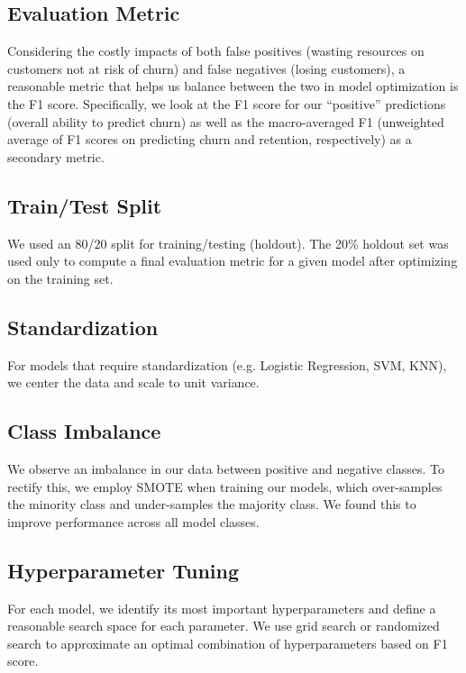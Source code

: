 \documentclass[twoside,twocolumn]{article}
\begin{document}
\noindent\subsection{Evaluation Metric} Considering the costly impacts of both false positives (wasting resources on customers not at risk of churn) and false negatives (losing customers), a reasonable metric that helps us balance between the two in model optimization is the F1 score. Specifically, we look at the F1 score for our “positive” predictions (overall ability to predict churn) as well as the macro-averaged F1 (unweighted average of F1 scores on predicting churn and retention, respectively) as a secondary metric.

\noindent\subsection{Train/Test Split} We used an 80/20 split for training/testing (holdout). The 20\% holdout set was used only to compute a final evaluation metric for a given model after optimizing on the training set.

\noindent\subsection{Standardization} For models that require standardization (e.g. Logistic Regression, SVM, KNN), we center the data and scale to unit variance.

\noindent \subsection{Class Imbalance} We observe an imbalance in our data between positive and negative classes. To rectify this, we employ SMOTE when training our models, which over-samples the minority class and under-samples the majority class. We found this to improve performance across all model classes.

\noindent \subsection{Hyperparameter Tuning} For each model, we identify its most important hyperparameters and define a reasonable search space for each parameter. We use grid search or randomized search to approximate an optimal combination of hyperparameters based on F1 score.
\end{document}
